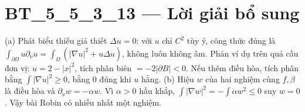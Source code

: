 \documentclass[10pt,a4paper]{article}
\begin{document}
\section*{BT\_5\_5\_3\_13 — Lời giải bổ sung}
(a) Phát biểu thiếu giả thiết $\Delta u=0$: với $u$ chỉ $C^2$ tùy ý, công thức đúng là $\int_{\partial\Omega}u\partial_\nu u=\int_\Omega(|\nabla u|^2+u\Delta u)$, không luôn không âm. Phản ví dụ trên quả cầu đơn vị: $u=2-|x|^2$, tích phân biên $=-2|\partial B|<0$. Nếu thêm điều hòa, tích phân bằng $\int|\nabla u|^2\ge0$, bằng 0 đúng khi $u$ hằng.
(b) Hiệu $w$ của hai nghiệm cùng $f,\beta$ là điều hòa và $\partial_\nu w=-\alpha w$. Vì $\alpha>0$ hầu khắp, $\int|\nabla w|^2=-\int\alpha w^2\le0$ suy $w=0$. Vậy bài Robin có nhiều nhất một nghiệm.
\end{document}
